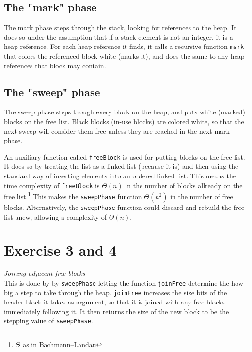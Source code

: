 \documentclass[a4paper, titlepage]{article}
\begin{document}
\subsection{The "mark" phase}
The mark phase steps through the stack, looking for references to the heap. It
does so under the assumption that if a stack element is not an integer, it is a
heap reference.
For each heap reference it finds, it calls a recursive function \texttt{mark}
that colors the referenced block white (marks it), and does the same to any heap references
that block may contain.
\subsection{The "sweep" phase}
The sweep phase steps though every block on the heap, and puts white (marked)
blocks on the free list. Black blocks (in-use blocks) are colored white, so that
the next sweep will consider them free unless they are reached in the next mark
phase.

An auxiliary function called \texttt{freeBlock} is used for putting blocks on
the free list. It does so by treating the list as a linked list (because it is)
and then using the standard way of inserting elements into an ordered linked
list. This means the time complexity of \texttt{freeBlock} is $\Theta(n)$ in the number
of blocks allready on the free list.\footnote{$\Theta$ as in Bachmann–Landau}
This makes the \texttt{sweepPhase} function $\Theta(n^2)$ in the number of free
blocks. Alternatively, the \texttt{sweepPhase} function could discard and
rebuild the free list anew, allowing a complexity of $\Theta(n)$.

\section{Exercise 3 and 4}
\textit{Joining adjacent free blocks}\\

This is done by by \texttt{sweepPhase} letting the function \texttt{joinFree}
determine the how big a step to take through the heap. \texttt{joinFree}
increases the size bits of the header-block it takes as argument, so that it is
joined with any free blocks immediately following it. It then returns the size
of the new block to be the stepping value of \texttt{sweepPhase}.
\end{document}
